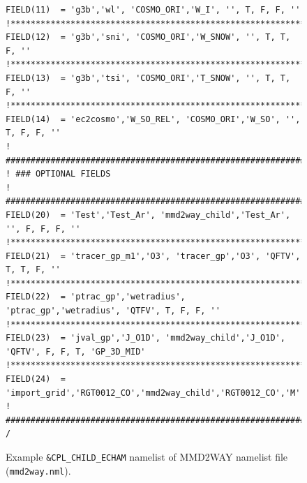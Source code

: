 \documentclass[11pt,twoside]{article}
\begin{document}
\begin{figure}
{\begin{verbatim}
FIELD(11)  = 'g3b','wl', 'COSMO_ORI','W_I', '', T, F, F, ''    
!********************************************************************************
FIELD(12)  = 'g3b','sni', 'COSMO_ORI','W_SNOW', '', T, T, F, '' 
!********************************************************************************
FIELD(13)  = 'g3b','tsi', 'COSMO_ORI','T_SNOW', '', T, T, F, ''  
!********************************************************************************
FIELD(14)  = 'ec2cosmo','W_SO_REL', 'COSMO_ORI','W_SO', '', T, F, F, ''
! ###############################################################################
! ### OPTIONAL FIELDS
! ###############################################################################
FIELD(20)  = 'Test','Test_Ar', 'mmd2way_child','Test_Ar', '', F, F, F, '' 
!********************************************************************************
FIELD(21)  = 'tracer_gp_m1','O3', 'tracer_gp','O3', 'QFTV', T, T, F, ''
!********************************************************************************
FIELD(22)  = 'ptrac_gp','wetradius', 'ptrac_gp','wetradius', 'QTFV', T, F, F, ''
!********************************************************************************
FIELD(23)  = 'jval_gp','J_O1D', 'mmd2way_child','J_O1D', 'QFTV', F, F, T, 'GP_3D_MID'
!********************************************************************************
FIELD(24)  = 'import_grid','RGT0012_CO','mmd2way_child','RGT0012_CO','M',F,F,T,'#UNKNOWN'
! ###############################################################################
/
\end{verbatim} 
}
\vspace*{-0.7cm}
\caption{Example {\tt \&CPL\_CHILD\_ECHAM} namelist of MMD2WAY namelist file ({\tt mmd2way.nml}).} 
\label{fig:nmlcplchildecham} 
\end{figure} 
\end{document}

